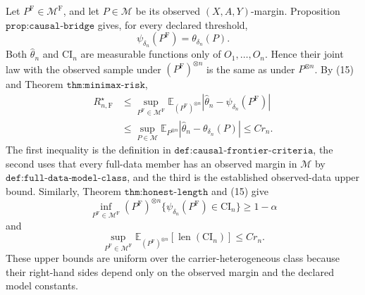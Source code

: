 Let \(P^{\mathrm F}\in\mathcal M^{\mathrm F}\), and let \(P\in\mathcal M\) be its observed \((X,A,Y)\)-margin. Proposition \(\texttt{prop:causal-bridge}\) gives, for every declared threshold,
\[
 \psi_{\delta_n}(P^{\mathrm F})=\theta_{\delta_n}(P).
 \tag{15}
\]
Both \(\widehat\theta_n\) and \(\mathrm{CI}_n\) are measurable functions only of \(O_1,\ldots,O_n\). Hence their joint law with the observed sample under \((P^{\mathrm F})^{\otimes n}\) is the same as under \(P^{\otimes n}\). By (15) and Theorem \(\texttt{thm:minimax-risk}\),
\[
\begin{aligned}
 R_{n,\mathrm F}^\star
 &\leq \sup_{P^{\mathrm F}\in\mathcal M^{\mathrm F}}
 \mathbb E_{(P^{\mathrm F})^{\otimes n}}
 |\widehat\theta_n-\psi_{\delta_n}(P^{\mathrm F})|\\
 &\leq \sup_{P\in\mathcal M}
 \mathbb E_{P^{\otimes n}}|\widehat\theta_n-\theta_{\delta_n}(P)|
 \leq C r_n.
\end{aligned}
\tag{16}
\]
The first inequality is the definition in \(\texttt{def:causal-frontier-criteria}\), the second uses that every full-data member has an observed margin in \(\mathcal M\) by \(\texttt{def:full-data-model-class}\), and the third is the established observed-data upper bound. Similarly, Theorem \(\texttt{thm:honest-length}\) and (15) give
\[
 \inf_{P^{\mathrm F}\in\mathcal M^{\mathrm F}}(P^{\mathrm F})^{\otimes n}
 \{\psi_{\delta_n}(P^{\mathrm F})\in\mathrm{CI}_n\}
 \geq1-\alpha
 \tag{17}
\]
and
\[
 \sup_{P^{\mathrm F}\in\mathcal M^{\mathrm F}}
 \mathbb E_{(P^{\mathrm F})^{\otimes n}}
 [\operatorname{len}(\mathrm{CI}_n)]
 \leq C r_n.
 \tag{18}
\]
These upper bounds are uniform over the carrier-heterogeneous class because their right-hand sides depend only on the observed margin and the declared model constants.

